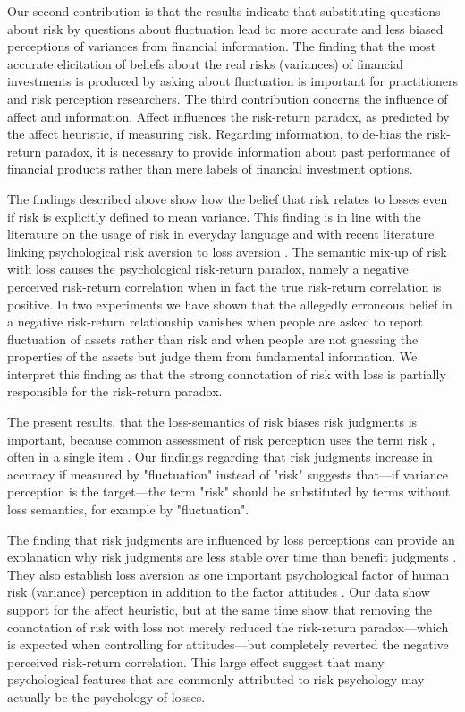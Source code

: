 \documentclass[a4paper,man, natbib,floatsintext]{apa6} %
\begin{document}
Our second contribution is that the results indicate that substituting questions about risk by questions about fluctuation lead to more accurate and less biased perceptions of variances from financial information. The finding that the most accurate elicitation of beliefs about the real risks (variances) of financial investments is produced by asking about fluctuation is important for practitioners and risk perception researchers. The third contribution concerns the influence of affect and information. Affect influences the risk-return paradox, as predicted by the affect heuristic, if measuring risk. Regarding information, to de-bias the risk-return paradox, it is necessary to provide information about past performance of financial products rather than mere labels of financial investment options.

The findings described above show how the belief that risk relates to losses even if risk is explicitly defined to mean variance. This finding is in line with the literature on the usage of risk in everyday language \citep{Boholm2016} and with recent literature linking psychological risk aversion to loss aversion \citep{Duxbury2004}. The semantic mix-up of risk with loss causes the psychological risk-return paradox, namely a negative perceived risk-return correlation when in fact the true risk-return correlation is positive. In two experiments we have shown that the allegedly erroneous belief in a negative risk-return relationship vanishes when people are asked to report fluctuation of assets rather than risk and when people are not guessing the properties of the assets but judge them from fundamental information. We interpret this finding as that the strong connotation of risk with loss is partially responsible for the risk-return paradox. 

The present results, that the loss-semantics of risk biases risk judgments is important, because common assessment of risk perception uses the term risk \citep[e.g.,][]{Socio-EconomicPanelSOEP2012}, often in a single item \citep[e.g.,][]{Keller2006}. Our findings regarding that risk judgments increase in accuracy if measured by "fluctuation" instead of "risk" suggests that---if variance perception is the target---the term "risk" should be substituted by terms without loss semantics, for example by "fluctuation".

The finding that risk judgments are influenced by loss perceptions can provide an explanation why risk judgments are less stable over time than benefit judgments \citep{Connor2016}. They also establish loss aversion as one important psychological factor of human risk (variance) perception in addition to the factor attitudes \citep{Finucane2000, Slovic2007}. Our data show support for the affect heuristic, but at the same time show that removing the connotation of risk with loss not merely reduced the risk-return paradox---which is expected when controlling for attitudes---but completely reverted the negative perceived risk-return correlation. This large effect suggest that many psychological features that are commonly attributed to risk psychology may actually be the psychology of losses.
\end{document}
